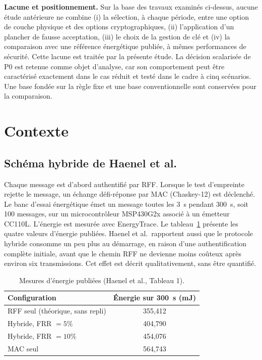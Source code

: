 \documentclass[conference]{IEEEtran}
\begin{document}
\textbf{Lacune et positionnement.} Sur la base des travaux examinés ci-dessus, aucune étude antérieure ne combine (i) la sélection, à chaque période, entre une option de couche physique et des options cryptographiques, (ii) l'application d'un plancher de fausse acceptation, (iii) le choix de la gestion de clé et (iv) la comparaison avec une référence énergétique publiée, à mêmes performances de sécurité. Cette lacune est traitée par la présente étude. La décision scalarisée de P0 est retenue comme objet d'analyse, car son comportement peut être caractérisé exactement dans le cas réduit et testé dans le cadre à cinq scénarios. Une base fondée sur la règle fixe et une base conventionnelle sont conservées pour la comparaison.

\section{Contexte}
\label{sec:background}

\subsection{Schéma hybride de Haenel et al.}

Chaque message est d'abord authentifié par RFF. Lorsque le test d'empreinte rejette le message, un échange défi-réponse par MAC (Chaskey-12) est déclenché. Le banc d'essai énergétique émet un message toutes les 3~s pendant 300~s, soit 100 messages, sur un microcontrôleur MSP430G2x associé à un émetteur CC110L. L'énergie est mesurée avec EnergyTrace. Le tableau~\ref{tab:published} présente les quatre valeurs d'énergie publiées. Haenel et al.\ rapportent aussi que le protocole hybride consomme un peu plus au démarrage, en raison d'une authentification complète initiale, avant que le chemin RFF ne devienne moins coûteux après environ six transmissions. Cet effet est décrit qualitativement, sans être quantifié.

\begin{table}[t]
\centering
\caption{Mesures d'énergie publiées (Haenel et al., Tableau 1).}
\label{tab:published}
\begin{tabular}{lc}
\toprule
Configuration & Énergie sur 300~s (mJ) \\
\midrule
RFF seul (théorique, sans repli) & 355,412 \\
Hybride, FRR $=5\%$ & 404,790 \\
Hybride, FRR $=10\%$ & 454,076 \\
MAC seul & 564,743 \\
\bottomrule
\end{tabular}
\end{table}
\end{document}
